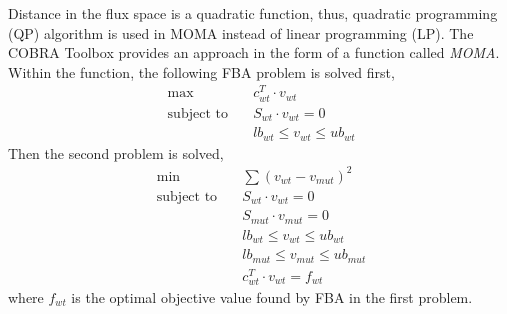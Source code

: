 Distance in the flux space is a quadratic function, thus, quadratic programming (QP) algorithm is used in MOMA instead of linear programming (LP). The COBRA Toolbox provides an approach in the form of a function called \emph{MOMA}. Within the function, the following FBA problem is solved first,
\begin{align}
 \ \text{max} \quad & c^T_{wt} \cdot v_{wt} \\
 \label{eq:moma_1}
 \ \text{subject to} \quad & S_{wt} \cdot v_{wt}=0 \\
 \ & lb_{wt} \leq v_{wt} \leq ub_{wt}
\end{align}
\noindent
Then the second problem is solved,
\begin{align}
 \ \text{min} \quad & \sum (v_{wt} - v_{mut})^2\\
 \label{eq:moma_2}
 \ \text{subject to} \quad & S_{wt} \cdot v_{wt}=0 \\
 \ & S_{mut} \cdot v_{mut}=0 \\
 \ & lb_{wt} \leq v_{wt} \leq ub_{wt} \\
 \ & lb_{mut} \leq v_{mut} \leq ub_{mut} \\
 \ & c^T_{wt} \cdot v_{wt} = f_{wt}
\end{align}
\noindent
where $f_{wt}$ is the optimal objective value found by FBA in the first problem.
